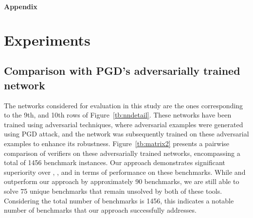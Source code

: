 
\begin{center}
    \Large{\bf{Appendix}}    
\end{center}

\section{Experiments}
\subsection{Comparison with PGD's adversarially trained network}
\label{ap:exp:1}

The networks considered for evaluation in this study are the ones corresponding to the 9th, and 10th 
rows of Figure~\ref{tb:nndetail}. These networks have been trained using adversarial techniques, 
where adversarial examples were generated using PGD attack, and the network was subsequently 
trained on these adversarial examples to enhance its robustness. Figure~\ref{tb:matrix2} presents a 
pairwise comparison of verifiers on these adversarially trained networks, 
encompassing a total of 1456 benchmark instances. 
Our approach demonstrates significant superiority over \deeppoly{}, \kpoly{}, and \deepsrgr{} in terms of 
performance on these benchmarks. While \alphabeta{} and \ovaltool{} outperform our approach by approximately 
90 benchmarks, we are still able to solve 75 unique benchmarks that remain unsolved by both of these tools. 
Considering the total number of benchmarks is 1456, this indicates a notable number of benchmarks that our 
approach successfully addresses.


